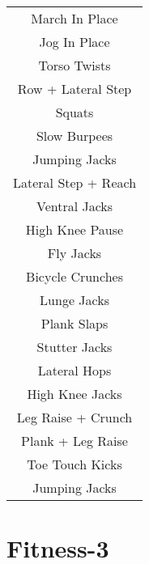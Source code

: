 \documentclass[12pt]{article}
\newcommand\myPadding{1.5}
\begin{document}
\begin{center}
  \bgroup
  \def\arraystretch{\myPadding}%
  \begin{tabular}{ c  }
  March In Place
\\
Jog In Place
\\
Torso Twists
\\
Row + Lateral Step
\\
Squats
\\
Slow Burpees
\\
Jumping Jacks
\\
Lateral Step + Reach
\\
Ventral Jacks
\\
High Knee Pause
\\
Fly Jacks
\\
Bicycle Crunches
\\
Lunge Jacks
\\
Plank Slaps
\\
Stutter Jacks
\\
Lateral Hops
\\
High Knee Jacks
\\
Leg Raise + Crunch
\\
Plank + Leg Raise
\\
Toe Touch Kicks
\\
Jumping Jacks
  \end{tabular}
  \egroup
\end{center}







\section{Fitness-3}
\end{document}
